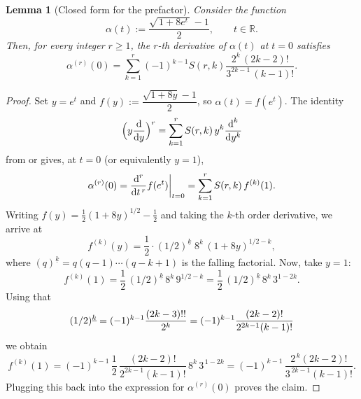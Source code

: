 \documentclass[11pt,a4paper]{article}
\numberwithin{equation}{section}
\newtheorem {lemma}[theorem]{Lemma}
\newcommand{\dint}{\textup{d}}
\def\RR{\mathbb{R}}
\begin{document}
\begin{lemma}[Closed form for the prefactor]\label{lem:Prefactor}
Consider the function
\begin{equation*}
\alpha(t):=\frac{\sqrt{\,1+8e^{t}\,}-1}{2},\qquad t\in\RR.
\end{equation*}
Then, for every integer $r\ge 1$, the $r$-th derivative of $\alpha(t)$ at $t=0$ satisfies
\begin{equation*}
\alpha^{(r)}(0)
=\sum_{k=1}^{r} (-1)^{k-1}S(r,k)
\frac{2^{k}\,(2k-2)!}{3^{2k-1}\,(k-1)!}.
\end{equation*}
\end{lemma}
\begin{proof}
Set $y=e^{t}$ and $f(y):=\dfrac{\sqrt{1+8y}-1}{2}$, so $\alpha(t)=f(e^{t})$. The identity
\begin{equation*}
\Big(y\frac{\dint}{\dint y}\Big)^{r}=\sum_{k=1}^{r} S(r,k)\,y^{k}\frac{\dint^{k}}{\dint y^{k}}
\end{equation*}
from \cite[p.\ 218]{Riordan1968} or \cite[Ex.\ 13 on p.\ 310]{ConcreteMathematics}
gives, at $t=0$ (or equivalently $y=1$),
\begin{equation*}
\alpha^{(r)}(0)=\frac{\dint^{r}}{\dint t^{\,r}}f(e^{t})\bigg|_{t=0}
=\sum_{k=1}^{r} S(r,k)\,f^{(k)}(1).
\end{equation*}
Writing $f(y)=\tfrac{1}{2}(1+8y)^{1/2}-\tfrac{1}{2}$ and taking the $k$-th order derivative, we arrive at
\begin{equation*}
f^{(k)}(y)=\frac{1}{2}\cdot(1/2)^{\underline{k}}\;8^{k}\,(1+8y)^{1/2-k},
\end{equation*}
where $(q)^{\underline{k}}=q(q-1)\cdots(q-k+1)$ is the falling factorial. Now, take $y=1$:
\begin{equation*}
f^{(k)}(1)=\frac{1}{2}\,(1/2)^{\underline{k}}\,8^{k}\,9^{1/2-k}
=\frac{1}{2}\,(1/2)^{\underline{k}}\,8^{k}\,3^{1-2k}.
\end{equation*}
Using that
\begin{equation*}
(1/2)^{\underline{k}}
= (-1)^{k-1}{(2k-3)!!\over 2^k} = (-1)^{k-1}{(2k-2)!\over 2^{2k-1}(k-1)!}
\end{equation*}
we obtain
\begin{equation*}
f^{(k)}(1)=(-1)^{k-1}\,\frac{1}{2}\,\frac{(2k-2)!}{2^{2k-1}(k-1)!}\,8^k\,3^{\,1-2k}
=(-1)^{k-1}\,\frac{2^{\,k}(2k-2)!}{3^{\,2k-1}(k-1)!}.
\end{equation*}
Plugging this back into the expression for $\alpha^{(r)}(0)$ proves the claim.
\end{proof}
\end{document}
